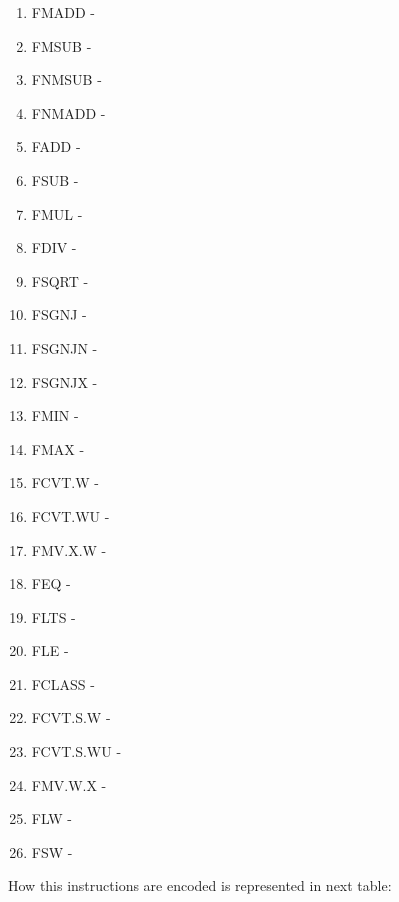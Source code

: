 \documentclass{scrreprt}
\begin{document}
\begin{enumerate}
        \item FMADD -   
        \item FMSUB -  
        \item FNMSUB -  
        \item FNMADD - 
        \item FADD -  
        \item FSUB - 
        \item FMUL -  
        \item FDIV -
        \item FSQRT -
        \item FSGNJ -
        \item FSGNJN -
        \item FSGNJX -
        \item FMIN -
        \item FMAX -
        \item FCVT.W -
        \item FCVT.WU -
        \item FMV.X.W -
        \item FEQ -
        \item FLTS -
        \item FLE -
        \item FCLASS -
        \item FCVT.S.W -
        \item FCVT.S.WU -
        \item FMV.W.X -
        \item FLW -
        \item FSW -
\end{enumerate}
\newpage
How this instructions are encoded is represented in next table:
\end{document}
